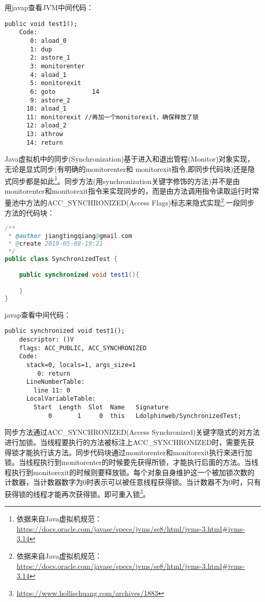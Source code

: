 \documentclass[../../../interview-questions.tex]{subfiles}
\begin{document}
用javap查看JVM中间代码：

\begin{lstlisting}
public void test1();
    Code:
       0: aload_0
       1: dup
       2: astore_1
       3: monitorenter
       4: aload_1
       5: monitorexit
       6: goto          14
       9: astore_2
      10: aload_1
      11: monitorexit //再加一个monitorexit，确保释放了锁
      12: aload_2
      13: athrow
      14: return
\end{lstlisting}

Java虚拟机中的同步(Synchronization)基于进入和退出管程(Monitor)对象实现，无论是显式同步(有明确的monitorenter和 monitorexit指令,即同步代码块)还是隐式同步都是如此\footnote{依据来自Java虚拟机规范：\url{https://docs.oracle.com/javase/specs/jvms/se8/html/jvms-3.html\#jvms-3.14}}。同步方法(用synchronization关键字修饰的方法)并不是由monitorenter和monitorexit指令来实现同步的，而是由方法调用指令读取运行时常量池中方法的ACC\_SYNCHRONIZED(Access Flags)标志来隐式实现\footnote{依据来自Java虚拟机规范：\url{https://docs.oracle.com/javase/specs/jvms/se8/html/jvms-3.html\#jvms-3.14}}.一段同步方法的代码块：

\begin{lstlisting}[language=Java]
/**
 * @author jiangtingqiang@gmail.com
 * @create 2019-05-08-19:21
 */
public class SynchronizedTest {

    public synchronized void test1(){

    }
}
\end{lstlisting}

javap查看中间代码：

\begin{lstlisting}
public synchronized void test1();
    descriptor: ()V
    flags: ACC_PUBLIC, ACC_SYNCHRONIZED
    Code:
      stack=0, locals=1, args_size=1
         0: return
      LineNumberTable:
        line 11: 0
      LocalVariableTable:
        Start  Length  Slot  Name   Signature
            0       1     0  this   Ldolphinweb/SynchronizedTest;
\end{lstlisting}

同步方法通过ACC\_SYNCHRONIZED(Access Synchronized)关键字隐式的对方法进行加锁。当线程要执行的方法被标注上ACC\_SYNCHRONIZED时，需要先获得锁才能执行该方法。同步代码块通过monitorenter和monitorexit执行来进行加锁。当线程执行到monitorenter的时候要先获得所锁，才能执行后面的方法。当线程执行到monitorexit的时候则要释放锁。每个对象自身维护这一个被加锁次数的计数器，当计数器数字为0时表示可以被任意线程获得锁。当计数器不为0时，只有获得锁的线程才能再次获得锁。即可重入锁\footnote{\url{https://www.hollischuang.com/archives/1883}}。
\end{document}
